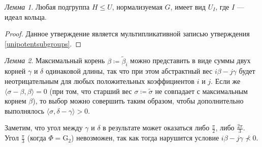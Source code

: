 \documentclass[10pt]{article}
\theoremstyle{remark}
\newtheorem{lm}{Лемма}
\renewcommand{\le}{\leqslant}
\begin{document}
\begin{lm}\label{unipotenttransitivity}
  Любая подгруппа $H \le U$, нормализуемая $G$, имеет вид $U_I$, где $I$ --- идеал кольца.
\end{lm}
\begin{proof}
  Данное утверждение является мультипликативной записью утверждения \ref{unipotentsubgroups}.
\end{proof}


\begin{lm}\label{maxrootsum}
Максимальный корень $\beta\coloneqq\widetilde\beta_i$ можно представить в виде суммы двух корней $\gamma$ и $\delta$ одинаковой длины, так что при этом абстрактный вес $i\beta-j\gamma$ будет неотрицательным для любых положительных коэффициентов $i$ и $j$. Если же $\langle\sigma-\beta,\beta\rangle=0$ (при том, что старший вес $\sigma\coloneqq\widetilde\sigma$ не совпадает с максимальным корнем $\beta$), то выбор можно совершить таким образом, чтобы дополнительно выполнялось $\langle\sigma,\delta-\gamma\rangle>0$.

Заметим, что угол между $\gamma$ и $\delta$ в результате может оказаться либо $\frac{\pi}{2}$, либо $\frac{2\pi}{3}$. Угол $\frac{\pi}{3}$ (когда $\Phi = \mathrm{G}_2$) невозможен, так как тогда нарушится условие $i\beta-j\gamma \nprec 0$.
\end{lm}
\end{document}
